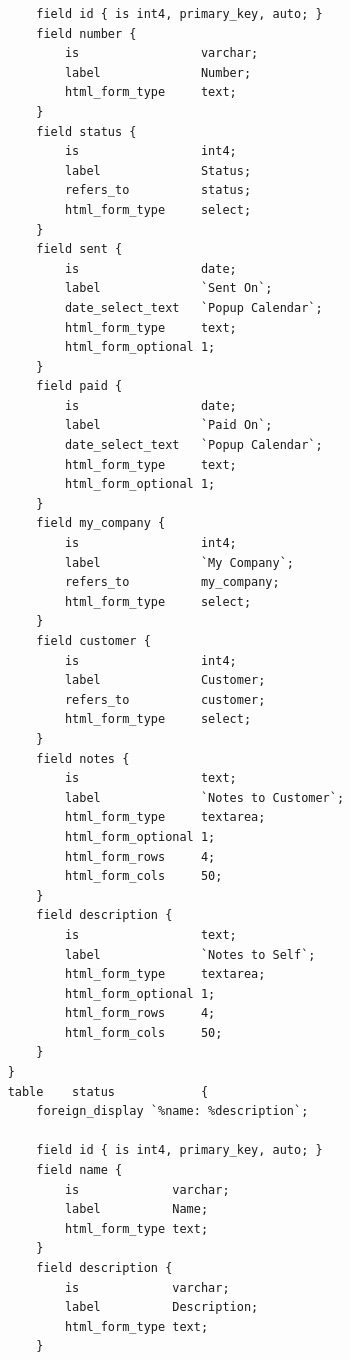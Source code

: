 \begin{verbatim}
        field id { is int4, primary_key, auto; }
        field number {
            is                 varchar;
            label              Number;
            html_form_type     text;
        }
        field status {
            is                 int4;
            label              Status;
            refers_to          status;
            html_form_type     select;
        }
        field sent {
            is                 date;
            label              `Sent On`;
            date_select_text   `Popup Calendar`;
            html_form_type     text;
            html_form_optional 1;
        }
        field paid {
            is                 date;
            label              `Paid On`;
            date_select_text   `Popup Calendar`;
            html_form_type     text;
            html_form_optional 1;
        }
        field my_company {
            is                 int4;
            label              `My Company`;
            refers_to          my_company;
            html_form_type     select;
        }
        field customer {
            is                 int4;
            label              Customer;
            refers_to          customer;
            html_form_type     select;
        }
        field notes {
            is                 text;
            label              `Notes to Customer`;
            html_form_type     textarea;
            html_form_optional 1;
            html_form_rows     4;
            html_form_cols     50;
        }
        field description {
            is                 text;
            label              `Notes to Self`;
            html_form_type     textarea;
            html_form_optional 1;
            html_form_rows     4;
            html_form_cols     50;
        }
    }
    table    status            {
        foreign_display `%name: %description`;

        field id { is int4, primary_key, auto; }
        field name {
            is             varchar;
            label          Name;
            html_form_type text;
        }
        field description {
            is             varchar;
            label          Description;
            html_form_type text;
        }


\end{verbatim}
